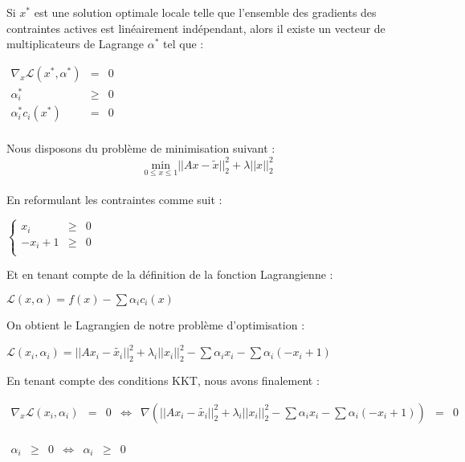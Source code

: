 \documentclass[12pt, a4paper]{report}
\newcommand{\Lagr}{\mathcal{L}}
\begin{document}
Si $x^*$ est une solution optimale locale telle que l'ensemble des gradients des contraintes actives est linéairement indépendant, alors il existe un vecteur de multiplicateurs de Lagrange $\alpha^*$
tel que :
\begin{center}
$\begin{array}{rcl}
\nabla_x \Lagr(x^*,\alpha^*)  & = & 0 \\
\alpha^*_i & \geq & 0 \\
\alpha^*_i c_i (x^*) & = & 0 \\
\end{array}$
\end{center}
Nous disposons du problème de minimisation suivant : \\
\[\underset{0 \leq x \leq 1}{\mathrm{min}} ||Ax - \tilde{x}||_2^2 + \lambda||x||_2^2\]\\
En reformulant les contraintes comme suit : 
\begin{center}
$\left\{\begin{array}{rcl}
x_i & \geq & 0 \\
-x_i + 1 & \geq & 0 \\
\end{array}\right.$
\end{center}
Et en tenant compte de la définition de la fonction Lagrangienne :
\begin{center}
$\Lagr(x,\alpha) = f(x) - \sum \alpha_i c_i(x)$ 
\end{center}
On obtient le Lagrangien de notre problème d'optimisation : 
\begin{center}
$\Lagr(x_i, \alpha_i) = ||Ax_i - \tilde{x_i}||_2^2  +  \lambda_i ||x_i||_2^2 - \sum \alpha_i x_i - \sum \alpha_i (- x_i + 1)$
\end{center}
En tenant compte des conditions KKT, nous avons finalement : 

\begin{center}
$\begin{array}{rclcrll}
\nabla_x \Lagr(x_i, \alpha_i) & = & 0 & \Leftrightarrow & \nabla(||Ax_i - \tilde{x_i}||_2^2  +  \lambda_i ||x_i||_2^2 - \sum \alpha_i x_i - \sum \alpha_i (- x_i + 1)) & = & 0\\
\end{array}$
\end{center}

\begin{center}
$\begin{array}{rclcrll}
\alpha_i & \geq & 0 & \Leftrightarrow & \alpha_i & \geq & 0 \\
\end{array}$
\end{center}
\end{document}

